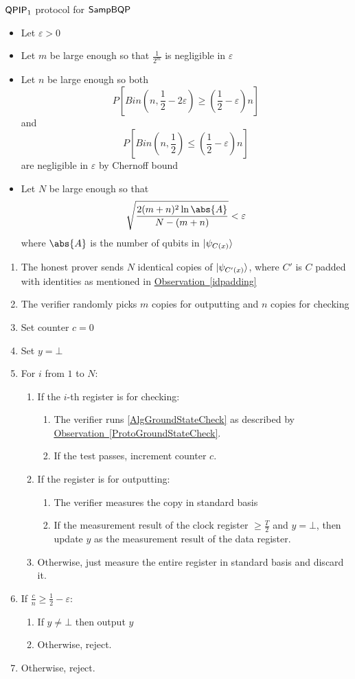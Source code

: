 \begin{protocol}{$\operatorname{\mathsf{QPIP}}_1$ protocol for $\operatorname{\mathsf{SampBQP}}$}
	\label{ProtoQPIP1}
	\begin{itemize}
		\item Let $\varepsilon>0$
		\item Let $m$ be large enough so that $\frac{1}{2^m}$ is negligible in $\varepsilon$
		\item Let $n$ be large enough so both
			$$P\left[Bin(n, \frac{1}{2}-2\varepsilon)\geq\left(\frac{1}{2}-\varepsilon\right)n\right]$$
			and
			$$P\left[Bin(n, \frac{1}{2})\leq\left(\frac{1}{2}-\varepsilon\right)n\right]$$ are negligible in $\varepsilon$ by Chernoff bound
		\item Let $N$ be large enough so that $$\sqrt{\frac{2(m+n)^2\ln\abs{A}}{N-(m+n)}}<\varepsilon$$
			where $\abs{A}$ is the number of qubits in $\ket{\psi_{C(x)}}$
	\end{itemize}
	\begin{enumerate}
		\item The honest prover sends $N$ identical copies of $\ket{\psi_{C'(x)}}$, where $C'$ is $C$ padded with identities as mentioned in \hyperref[idpadding]{Observation~\ref*{idpadding}}
		\item The verifier randomly picks $m$ copies for outputting and $n$ copies for checking
		\item Set counter $c=0$
		\item Set $y=\bot$
		\item For $i$ from $1$ to $N$:
		\begin{enumerate}
			\item If the $i$-th register is for checking:
			\begin{enumerate}
				\item The verifier runs \cref{AlgGroundStateCheck} as described by \hyperref[ProtoGroundStateCheck]{Observation~\ref*{ProtoGroundStateCheck}}.
				\item If the test passes, increment counter $c$.
			\end{enumerate}
			\item If the register is for outputting:
			\begin{enumerate}
				\item The verifier measures the copy in standard basis
				\item If the measurement result of the clock register $\geq\frac{T}{2}$ and $y=\bot$, then update $y$ as the measurement result of the data register.
			\end{enumerate}
			\item Otherwise, just measure the entire register in standard basis and discard it.
		\end{enumerate}
		\item If $\frac{c}{n}\geq\frac{1}{2}-\varepsilon$:
		\begin{enumerate}
			\item If $y\ne\bot$ then output $y$
			\item Otherwise, reject.
		\end{enumerate}
		\item Otherwise, reject.
	\end{enumerate}
\end{protocol}

